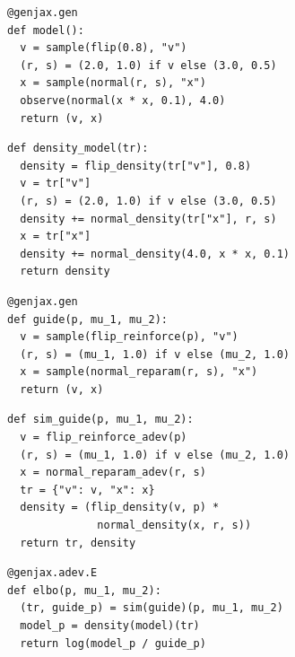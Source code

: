 \documentclass{article}
\begin{document}
\begin{verbatim}
@genjax.gen
def model():
  v = sample(flip(0.8), "v")
  (r, s) = (2.0, 1.0) if v else (3.0, 0.5)
  x = sample(normal(r, s), "x")
  observe(normal(x * x, 0.1), 4.0)
  return (v, x)
\end{verbatim}

\begin{verbatim}
def density_model(tr):
  density = flip_density(tr["v"], 0.8)
  v = tr["v"]
  (r, s) = (2.0, 1.0) if v else (3.0, 0.5)
  density += normal_density(tr["x"], r, s)
  x = tr["x"]
  density += normal_density(4.0, x * x, 0.1)
  return density
\end{verbatim}

\begin{verbatim}
@genjax.gen
def guide(p, mu_1, mu_2):
  v = sample(flip_reinforce(p), "v")
  (r, s) = (mu_1, 1.0) if v else (mu_2, 1.0)
  x = sample(normal_reparam(r, s), "x")
  return (v, x)
\end{verbatim}

\begin{verbatim}
def sim_guide(p, mu_1, mu_2):
  v = flip_reinforce_adev(p)
  (r, s) = (mu_1, 1.0) if v else (mu_2, 1.0)
  x = normal_reparam_adev(r, s)
  tr = {"v": v, "x": x}
  density = (flip_density(v, p) *
              normal_density(x, r, s))
  return tr, density
\end{verbatim}

\begin{verbatim}
@genjax.adev.E
def elbo(p, mu_1, mu_2):
  (tr, guide_p) = sim(guide)(p, mu_1, mu_2)
  model_p = density(model)(tr)
  return log(model_p / guide_p)
\end{verbatim}
\end{document}
